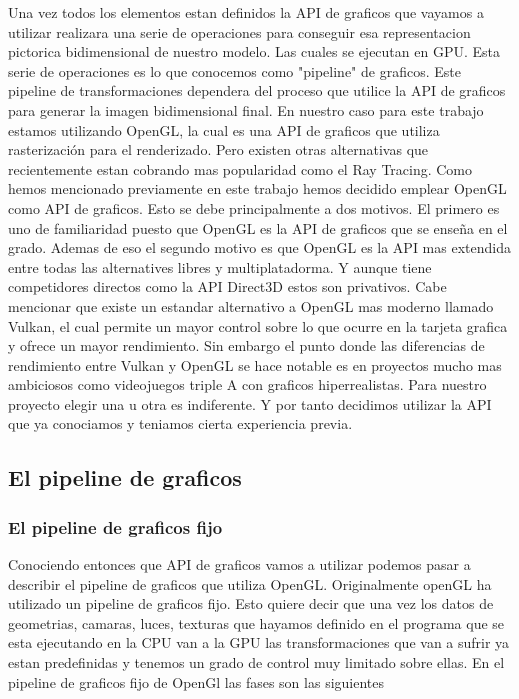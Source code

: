 Una vez todos los elementos estan definidos la API de graficos que vayamos a utilizar realizara una serie de operaciones para conseguir esa representacion pictorica bidimensional de nuestro modelo. Las cuales se ejecutan en GPU. Esta serie de operaciones es lo que conocemos como "pipeline" de graficos. Este pipeline de transformaciones dependera del proceso que utilice la API de graficos para generar
la imagen bidimensional final. En  nuestro caso para este trabajo estamos utilizando OpenGL, la cual es una API de graficos que utiliza rasterización para el renderizado. Pero existen otras alternativas que recientemente estan cobrando mas popularidad como el Ray Tracing. Como hemos mencionado previamente en este trabajo hemos decidido emplear OpenGL como API de graficos. Esto se debe principalmente a dos motivos. El primero es uno de familiaridad puesto que OpenGL es la API de graficos
que se enseña en el grado. Ademas de eso el segundo motivo es que OpenGL es la API mas extendida entre todas las alternatives libres y multiplatadorma. Y aunque tiene competidores directos como la API Direct3D estos son privativos. Cabe mencionar que existe un estandar alternativo a OpenGL mas moderno llamado Vulkan, el cual permite un mayor control sobre lo que ocurre en la tarjeta grafica y ofrece un mayor rendimiento. Sin embargo el punto donde las diferencias de rendimiento entre Vulkan y OpenGL 
se hace notable es en proyectos mucho mas ambiciosos como videojuegos triple A con graficos hiperrealistas. Para nuestro proyecto elegir una u otra es indiferente. Y por tanto decidimos utilizar la API que ya conociamos y teniamos cierta experiencia previa.

\subsection{El pipeline de graficos}

\subsubsection{El pipeline de graficos fijo}
Conociendo entonces que API de graficos vamos a utilizar podemos pasar a describir el pipeline de graficos que utiliza OpenGL. Originalmente
openGL ha utilizado un pipeline de graficos fijo. Esto quiere decir que una vez los datos de geometrias, camaras, luces, texturas que hayamos definido en el programa 
que se esta ejecutando en la CPU van a la GPU las transformaciones que van a sufrir ya estan predefinidas y tenemos un grado de control muy limitado sobre ellas. En el pipeline de graficos fijo
de OpenGl las fases son las siguientes

